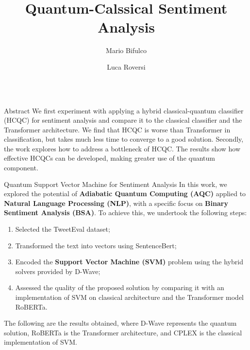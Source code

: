 \documentclass[final]{beamer}
\title{Quantum-Calssical Sentiment Analysis}
\author{Mario Bifulco\inst{1} \and Luca Roversi\inst{1}}
\institute[shortinst]{\inst{1} University of Turin, Computer Science Department}
\newlength{\colwidth}
\begin{document}
\begin{frame}[t,fragile]
\begin{columns}[t]

\begin{column}{\colwidth}
  \begin{block}{Abstract}
    We first experiment with applying a hybrid classical-quantum classifier (HCQC) for sentiment analysis and compare it to the classical classifier and the Transformer architecture. 
    We find that HCQC is worse than Transformer in classification, but takes much less time to converge to a good solution. 
    Secondly, the work explores how to address a bottleneck of HCQC. 
    The results show how effective HCQCs can be developed, making greater use of the quantum component.
  \end{block}

  \begin{block}{Quantum Support Vector Machine for Sentiment Analysis}
    In this work, we explored the potential of \textbf{Adiabatic Quantum Computing (AQC)} applied to \textbf{Natural Language Processing (NLP)}, with a specific focus on \textbf{Binary Sentiment Analysis (BSA)}. 
    To achieve this, we undertook the following steps:

    \begin{enumerate} 
      \item Selected the TweetEval dataset\cite{TweetEval}; 
      \item Transformed the text into vectors using SentenceBert\cite{SentenceBert}; 
      \item Encoded the \textbf{Support Vector Machine (SVM)} problem using the hybrid solvers provided by D-Wave; 
      \item Assessed the quality of the proposed solution by comparing it with an implementation of SVM on classical architecture and the Transformer model RoBERTa\cite{roberta}. 
    \end{enumerate}

    The following are the results obtained, where D-Wave represents the quantum solution, RoBERTa is the Transformer architecture, and CPLEX is the classical implementation of SVM.


\end{block}
\end{column}
\end{columns}
\end{frame}
\end{document}
